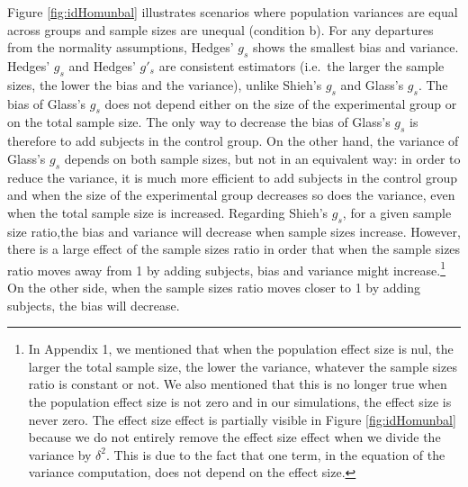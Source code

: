 \documentclass[
  man,floatsintext]{apa6}
\begin{document}
Figure \ref{fig:idHomunbal} illustrates scenarios where population variances are equal across groups and sample sizes are unequal (condition b). For any departures from the normality assumptions, Hedges' \(g_s\) shows the smallest bias and variance. Hedges' \(g_s\) and Hedges' \(g'_s\) are consistent estimators (i.e.~the larger the sample sizes, the lower the bias and the variance), unlike Shieh's \(g_s\) and Glass's \(g_s\). The bias of Glass's \(g_s\) does not depend either on the size of the experimental group or on the total sample size. The only way to decrease the bias of Glass's \(g_s\) is therefore to add subjects in the control group. On the other hand, the variance of Glass's \(g_s\) depends on both sample sizes, but not in an equivalent way: in order to reduce the variance, it is much more efficient to add subjects in the control group and when the size of the experimental group decreases so does the variance, even when the total sample size is increased. Regarding Shieh's \(g_s\), for a given sample size ratio,the bias and variance will decrease when sample sizes increase. However, there is a large effect of the sample sizes ratio in order that when the sample sizes ratio moves away from 1 by adding subjects, bias and variance might increase.\footnote{In Appendix 1, we mentioned that when the population effect size is nul, the larger the total sample size, the lower the variance, whatever the sample sizes ratio is constant or not. We also mentioned that this is no longer true when the population effect size is not zero and in our simulations, the effect size is never zero. The effect size effect is partially visible in Figure \ref{fig:idHomunbal} because we do not entirely remove the effect size effect when we divide the variance by $\delta^2$. This is due to the fact that one term, in the equation of the variance computation, does not depend on the effect size.} On the other side, when the sample sizes ratio moves closer to 1 by adding subjects, the bias will decrease.
\end{document}
